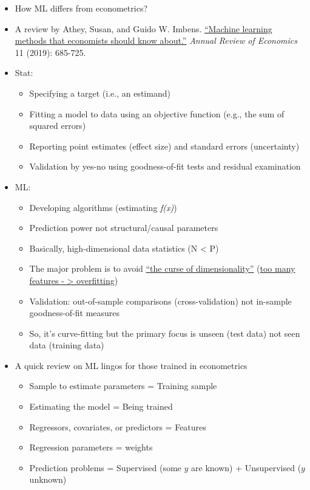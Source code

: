 \documentclass[
]{book}
\begin{document}
\begin{itemize}
\item
  How ML differs from econometrics?
\item
  A review by Athey, Susan, and Guido W. Imbens. \href{https://www.annualreviews.org/doi/full/10.1146/annurev-economics-080217-053433}{``Machine learning methods that economists should know about.''} \emph{Annual Review of Economics} 11 (2019): 685-725.
\item
  Stat:

  \begin{itemize}
  \item
    Specifying a target (i.e., an estimand)
  \item
    Fitting a model to data using an objective function (e.g., the sum of squared errors)
  \item
    Reporting point estimates (effect size) and standard errors (uncertainty)
  \item
    Validation by yes-no using goodness-of-fit tests and residual examination
  \end{itemize}
\item
  ML:

  \begin{itemize}
  \item
    Developing algorithms (estimating \emph{f(x)})
  \item
    Prediction power not structural/causal parameters
  \item
    Basically, high-dimensional data statistics (N \textless{} P)
  \item
    The major problem is to avoid \href{https://en.wikipedia.org/wiki/Curse_of_dimensionality}{``the curse of dimensionality''} (\href{https://towardsdatascience.com/the-curse-of-dimensionality-50dc6e49aa1e}{too many features - \textgreater{} overfitting})
  \item
    Validation: out-of-sample comparisons (cross-validation) not in-sample goodness-of-fit measures
  \item
    So, it's curve-fitting but the primary focus is unseen (test data) not seen data (training data)
  \end{itemize}
\item
  A quick review on ML lingos for those trained in econometrics

  \begin{itemize}
  \item
    Sample to estimate parameters = Training sample
  \item
    Estimating the model = Being trained
  \item
    Regressors, covariates, or predictors = Features
  \item
    Regression parameters = weights
  \item
    Prediction problems = Supervised (some \(y\) are known) + Unsupervised (\(y\) unknown)
  \end{itemize}
\end{itemize}
\end{document}
